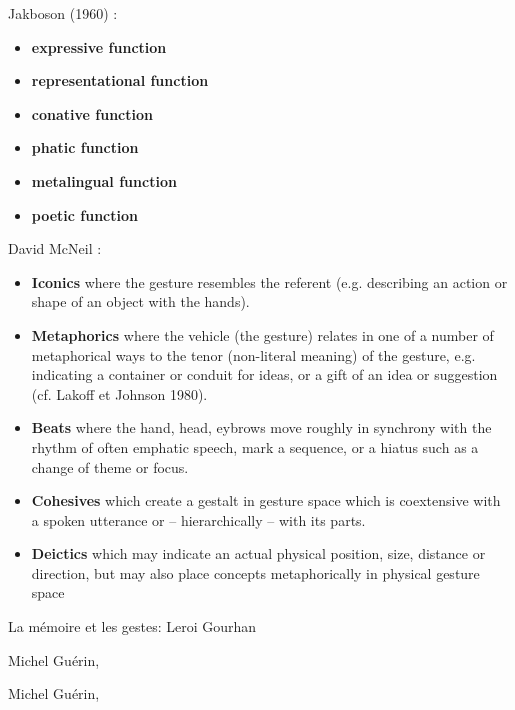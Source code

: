 \noindent Jakboson (1960) :
\vspace{-1em}
\begin{itemize}[noitemsep]
\item \textbf{expressive function}
\item \textbf{representational function}
\item \textbf{conative function}
\item \textbf{phatic function}
\item \textbf{metalingual function}
\item \textbf{poetic function}
\end{itemize}

\noindent David McNeil : 
\vspace{-1em}
\begin{itemize}[noitemsep]
\item \textbf{Iconics} where the gesture resembles the referent (e.g. describing an action or shape of an object with the hands).
\item \textbf{Metaphorics} where the vehicle (the gesture) relates in one of a number of metaphorical ways to the tenor (non-literal meaning) of the gesture, e.g. indicating a container or conduit for ideas, or a gift of an idea or suggestion (cf. Lakoff et Johnson 1980).
\item \textbf{Beats} where the hand, head, eybrows move roughly in synchrony with the rhythm of often emphatic speech, mark a sequence, or a hiatus such as a change of theme or focus.
\item \textbf{Cohesives} which create a gestalt in gesture space which is coextensive with a spoken utterance or – hierarchically – with its parts.
\item \textbf{Deictics} which may indicate an actual physical position, size, distance or direction, but may also place concepts metaphorically in physical gesture space
\end{itemize}


La mémoire et les gestes:
Leroi Gourhan

 Michel Guérin, \cite{guerin_philosophie_2018}


 Michel Guérin, \cite{guerin_philosophie_2018}



